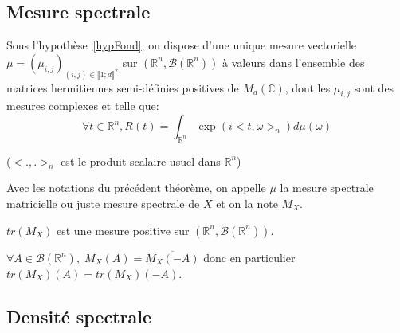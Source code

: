 \subsection{Mesure spectrale}

\begin{theorem}
Sous l'hypothèse~\ref{hypFond}, on dispose d'une unique mesure vectorielle $\mu = (\mu_{i,j})_{(i,j) \in \llbracket 1;d \rrbracket^2} $ sur $(\mathbb{R}^n, \mathcal{B}(\mathbb{R}^n))$ à valeurs dans l'ensemble des matrices hermitiennes semi-définies positives de $M_d(\mathbb{C})$, dont les $\mu_{i,j}$ sont des mesures complexes et telle que: \begin{equation} \forall t \in \mathbb{R}^n, R(t) = \displaystyle\int_{\mathbb{R}^n} \exp(i<t,\omega>_{n}) d\mu(\omega) \end{equation}
\end{theorem}

\noindent ($<.,.>_{n}$ est le produit scalaire usuel dans $\mathbb{R}^n$)

\begin{definition}
Avec les notations du précédent théorème, on appelle $\mu$ la mesure spectrale matricielle ou juste mesure spectrale de $X$ et on la note $M_X$.
\end{definition}

\begin{property}
$tr(M_X)$ est une mesure positive sur $(\mathbb{R}^n, \mathcal{B}(\mathbb{R}^n))$. 
\end{property}

\begin{property}
$\forall A \in \mathcal{B}(\mathbb{R}^n), \; M_X(A) = \overline{M_X(-A)}$ donc
en particulier $tr(M_X)(A) = tr(M_X)(-A)$.
\end{property}

\subsection{Densité spectrale}

